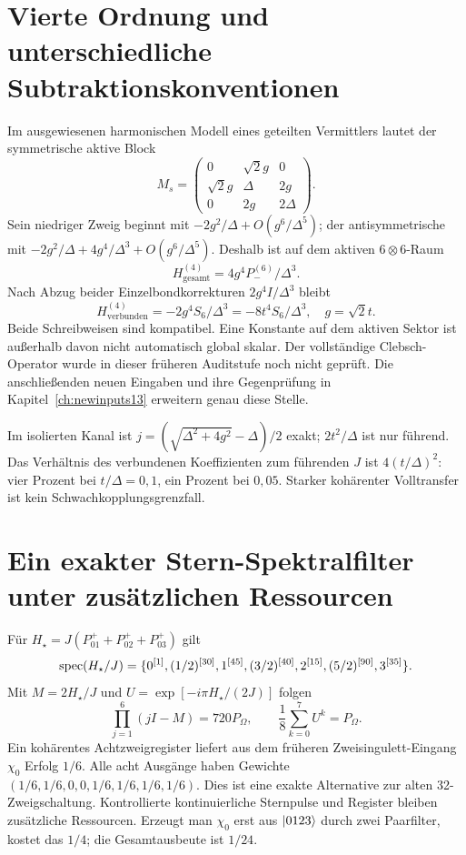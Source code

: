 \section{Vierte Ordnung und unterschiedliche Subtraktionskonventionen}
Im ausgewiesenen harmonischen Modell eines geteilten Vermittlers lautet der symmetrische aktive Block
\begin{equation}
M_s=\begin{pmatrix}0&\sqrt2g&0\\\sqrt2g&\Delta&2g\\0&2g&2\Delta\end{pmatrix}.
\end{equation}
Sein niedriger Zweig beginnt mit $-2g^2/\Delta+O(g^6/\Delta^5)$; der antisymmetrische mit $-2g^2/\Delta+4g^4/\Delta^3+O(g^6/\Delta^5)$. Deshalb ist auf dem aktiven $6\otimes6$-Raum
\begin{equation}
H^{(4)}_{\mathrm{gesamt}}=4g^4P_-^{(6)}/\Delta^3.
\end{equation}
Nach Abzug beider Einzelbondkorrekturen $2g^4I/\Delta^3$ bleibt
\begin{equation}
H^{(4)}_{\mathrm{verbunden}}=-2g^4S_6/\Delta^3
=-8t^4S_6/\Delta^3,\quad g=\sqrt2t.
\end{equation}
Beide Schreibweisen sind kompatibel. Eine Konstante auf dem aktiven Sektor ist außerhalb davon nicht automatisch global skalar. Der vollständige Clebsch-Operator wurde in dieser früheren Auditstufe noch nicht geprüft. Die anschließenden neuen Eingaben und ihre Gegenprüfung in Kapitel~\ref{ch:newinputs13} erweitern genau diese Stelle.

Im isolierten Kanal ist $j=(\sqrt{\Delta^2+4g^2}-\Delta)/2$ exakt; $2t^2/\Delta$ ist nur führend. Das Verhältnis des verbundenen Koeffizienten zum führenden $J$ ist $4(t/\Delta)^2$: vier Prozent bei $t/\Delta=0{,}1$, ein Prozent bei $0{,}05$. Starker kohärenter Volltransfer ist kein Schwachkopplungsgrenzfall.

\section{Ein exakter Stern-Spektralfilter unter zusätzlichen Ressourcen}
Für $H_\star=J(P^+_{01}+P^+_{02}+P^+_{03})$ gilt
\begin{equation}
\operatorname{spec}(H_\star/J)=
\{0^{[1]},(1/2)^{[30]},1^{[45]},(3/2)^{[40]},2^{[15]},(5/2)^{[90]},3^{[35]}\}.
\end{equation}
Mit $M=2H_\star/J$ und $U=\exp[-i\pi H_\star/(2J)]$ folgen
\begin{equation}
\prod_{j=1}^{6}(jI-M)=720P_\Omega,\qquad
\frac18\sum_{k=0}^{7}U^k=P_\Omega.
\end{equation}
Ein kohärentes Achtzweigregister liefert aus dem früheren Zweisingulett-Eingang $\chi_0$ Erfolg $1/6$. Alle acht Ausgänge haben Gewichte $(1/6,1/6,0,0,1/6,1/6,1/6,1/6)$. Dies ist eine exakte Alternative zur alten 32-Zweigschaltung. Kontrollierte kontinuierliche Sternpulse und Register bleiben zusätzliche Ressourcen. Erzeugt man $\chi_0$ erst aus $\lvert0123\rangle$ durch zwei Paarfilter, kostet das $1/4$; die Gesamtausbeute ist $1/24$.

